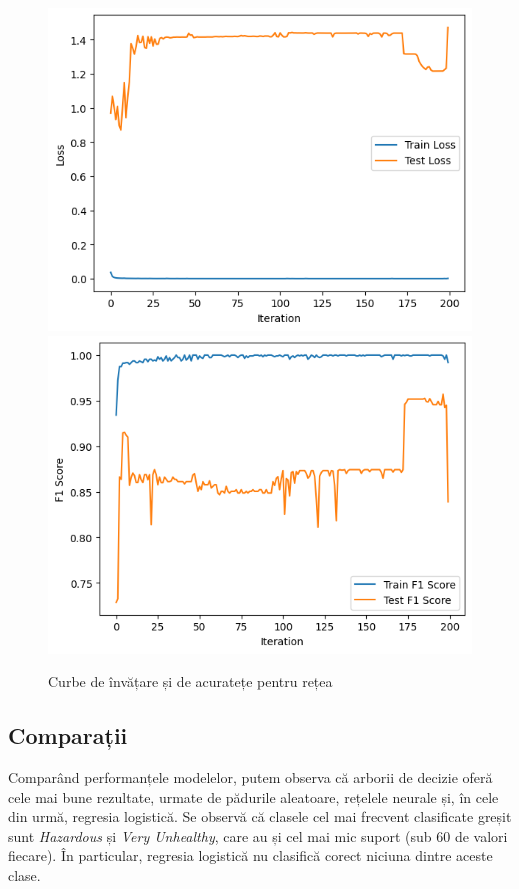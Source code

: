 \documentclass{article}
\begin{document}
\begin{figure}[htb]
    \centering
    \includegraphics[scale=0.5]{air_pollution/learning/loss.png}
    \includegraphics[scale=0.5]{air_pollution/learning/f1.png}
    \caption{Curbe de învățare și de acuratețe pentru rețea}
    \label{fig:pol:nn_loss}
\end{figure}

\subsection{Comparații}

Comparând performanțele modelelor, putem observa că arborii de decizie oferă 
cele mai bune rezultate, urmate de pădurile aleatoare, rețelele neurale și, în 
cele din urmă, regresia logistică. Se observă că clasele cel mai frecvent 
clasificate greșit sunt \textit{Hazardous} și \textit{Very Unhealthy}, care au 
și cel mai mic suport (sub 60 de valori fiecare). În particular, regresia 
logistică nu clasifică corect niciuna dintre aceste clase.
\end{document}
